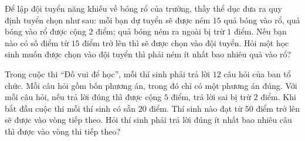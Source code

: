 \begin{bt}
	Để lập đội tuyển năng khiếu về bóng rổ của trường, thầy thể dục đưa ra quy định tuyển chọn như sau: mỗi bạn dự tuyển sẽ được ném $15$ quả bóng vào rổ, quả bóng vào rổ được cộng $2$ điểm; quả bóng ném ra ngoài bị trừ $1$ điểm. Nếu bạn nào có số điểm từ $15$ điểm trở lên thì sẽ được chọn vào đội tuyển. Hỏi một học sinh muốn được chọn vào đội tuyển thì phải ném ít nhất bao nhiêu quả vào rổ?
\end{bt}
\begin{bt}
	Trong cuộc thi ``Đố vui để học'', mỗi thí sinh phải trả lời $12$ câu hỏi của ban tổ chức. Mỗi câu hỏi gồm bốn phương án, trong đó chỉ có một phương án đúng. Với mỗi câu hỏi, nếu trả lời đúng thì được cộng $5$ điểm, trả lời sai bị trừ $2$ điểm. Khi bắt đầu cuộc thi mỗi thí sinh có sẵn $20$ điểm. Thí sinh nào đạt từ $50$ điểm trở lên sẽ được vào vòng tiếp theo. Hỏi thí sinh phải trả lời đúng ít nhất bao nhiêu câu thì được vào vòng thi tiếp theo?
\end{bt}
